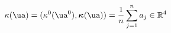 \begin{equation}
\label{bary}
\kappa(\ua)=(\kappa^0(\ua^0),\boldsymbol\kappa(\boldsymbol\ua))
=\frac{1}{n}\sum_{j=1}^na_j\in\mathbb R^4
\end{equation}

